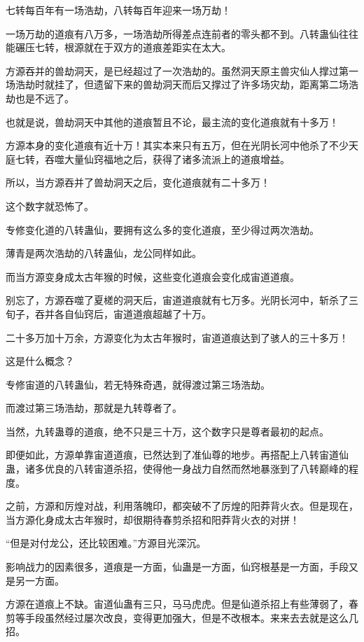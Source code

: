 \begin{this_body}
七转每百年有一场浩劫，八转每百年迎来一场万劫！

一场万劫的道痕有八万多，一场浩劫所得差点连前者的零头都不到。八转蛊仙往往能碾压七转，根源就在于双方的道痕差距实在太大。

方源吞并的兽劫洞天，是已经超过了一次浩劫的。虽然洞天原主兽灾仙人撑过第一场浩劫时就挂了，但遗留下来的兽劫洞天而后又撑过了许多场灾劫，距离第二场浩劫也是不远了。

也就是说，兽劫洞天中其他的道痕暂且不论，最主流的变化道痕就有十多万！

方源本身的变化道痕有近十万！其实本来只有五万，但在光阴长河中他杀了不少天庭七转，吞噬大量仙窍福地之后，获得了诸多流派上的道痕增益。

所以，当方源吞并了兽劫洞天之后，变化道痕就有二十多万！

这个数字就恐怖了。

专修变化道的八转蛊仙，要拥有这么多的变化道痕，至少得过两次浩劫。

薄青是两次浩劫的八转蛊仙，龙公同样如此。

而当方源变身成太古年猴的时候，这些变化道痕会变化成宙道道痕。

别忘了，方源吞噬了夏槎的洞天后，宙道道痕就有七万多。光阴长河中，斩杀了三旬子，吞并各自仙窍后，宙道道痕超越了十万。

二十多万加十万余，方源变化为太古年猴时，宙道道痕达到了骇人的三十多万！

这是什么概念？

专修宙道的八转蛊仙，若无特殊奇遇，就得渡过第三场浩劫。

而渡过第三场浩劫，那就是九转尊者了。

当然，九转蛊尊的道痕，绝不只是三十万，这个数字只是尊者最初的起点。

即便如此，方源单靠宙道道痕，已然达到了准仙尊的地步。再搭配上八转宙道仙蛊，诸多优良的八转宙道杀招，使得他一身战力自然而然地暴涨到了八转巅峰的程度。

之前，方源和厉煌对战，利用落魄印，都突破不了厉煌的阳莽背火衣。但是现在，当方源化身成太古年猴时，却很期待春剪杀招和阳莽背火衣的对拼！

“但是对付龙公，还比较困难。”方源目光深沉。

影响战力的因素很多，道痕是一方面，仙蛊是一方面，仙窍根基是一方面，手段又是另一方面。

方源在道痕上不缺。宙道仙蛊有三只，马马虎虎。但是仙道杀招上有些薄弱了，春剪等手段虽然经过屡次改良，变得更加强大，但是不改根本。来来去去就是这么几招。


\end{this_body}
